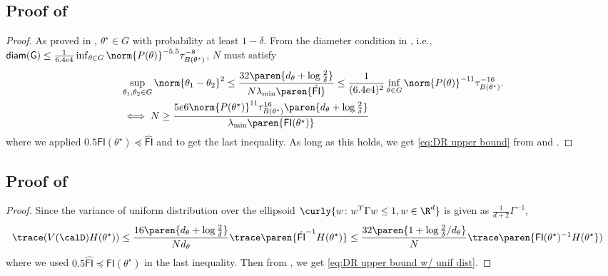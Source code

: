 \subsection{Proof of \texorpdfstring{}{}}
\label{subsec: Proof of DR upper bound}
\begin{proof}
    As proved in , $\theta^\star\in G$ with probability at least $1-\delta$. 
    From the diameter condition in , i.e., $\mathsf{diam(G)}\leq\frac{1}{6.4e4}\inf_{\theta\in G}\norm{P(\theta)}^{-5.5} \tau_{B(\theta^\star)}^{-8}$, $N$ must satisfy
    \begin{align*}
        & \sup_{\theta_1, \theta_2\in G}\norm{\theta_1-\theta_2}^2\leq \frac{32\paren{d_\theta+\log\frac{2}{\delta}}}{N\lambda_{\min}\paren{\hat{\mathsf{FI}}}} \leq \frac{1}{(6.4e4)^2}\inf_{\theta\in G}\norm{P(\theta)}^{-11} \tau_{B(\theta^\star)}^{-16}.  \\
        &\iff N \geq \frac{5e6\norm{P(\theta^\star)}^{11} \tau_{B(\theta^\star)}^{16}\paren{d_\theta+\log\frac{2}{\delta}}}{\lambda_{\min}\paren{\mathsf{FI}(\theta^\star)}}
    \end{align*} 
    where we applied $0.5\mathsf{FI}(\theta^\star)\preceq\hat{\mathsf{FI}}$ and  to get the last inequality.
    As long as this holds, we get \eqref{eq:DR upper bound} from  and . 
\end{proof}

\subsection{Proof of \texorpdfstring{}{}}
\label{subsec: Proof of DR upper bound w/ uniform distribution}
\begin{proof}
    Since the variance of uniform distribution over the ellipsoid $\curly{w \colon w^T\Gamma w\leq1, w\in\R^d}$ is given as $\frac{1}{d+2}\Gamma^{-1}$, 
    \begin{align*}
        \trace(V(\calD)H(\theta^\star)) &\leq \frac{16\paren{d_\theta+\log\frac{2}{\delta}}}{Nd_\theta}\trace\paren{\hat{\mathsf{FI}}^{-1}H(\theta^\star)} \leq \frac{32\paren{1+\log\frac{2}{\delta}/d_\theta}}{N}\trace\paren{{\mathsf{FI}}(\theta^\star)^{-1}H(\theta^\star})
    \end{align*}
    where we used $0.5\hat{\mathsf{FI}}\preceq {\mathsf{FI}}(\theta^\star)$ in the last inequality. Then from , we get \eqref{eq:DR upper bound w/ unif dist}. 
\end{proof}
